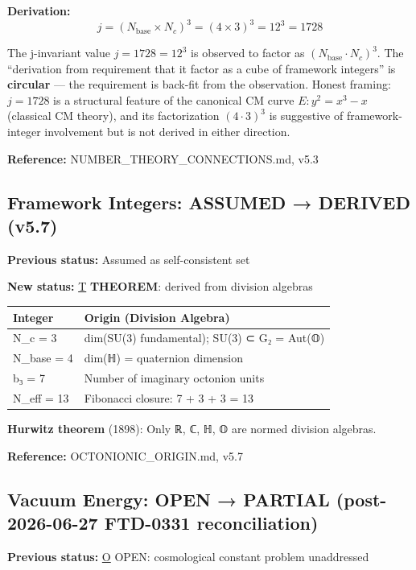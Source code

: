 \documentclass[
  11pt,
  letterpaper,
  twoside,
  openright]{book}
\begin{document}
\textbf{Derivation:}
\[j = (N_{\text{base}} \times N_c)^3 = (4 \times 3)^3 = 12^3 = 1728\]

The j-invariant value \(j = 1728 = 12^3\) is observed to factor as
\((N_\mathrm{base} \cdot N_c)^3\). The ``derivation from requirement
that it factor as a cube of framework integers'' is \textbf{circular}
--- the requirement is back-fit from the observation. Honest framing:
\(j = 1728\) is a structural feature of the canonical CM curve
\(E: y^2 = x^3 - x\) (classical CM theory), and its factorization
\((4 \cdot 3)^3\) is suggestive of framework-integer involvement but is
not derived in either direction.

\textbf{Reference:} NUMBER\_THEORY\_CONNECTIONS.md, v5.3

\subsection{Framework Integers: ASSUMED → DERIVED
(v5.7)}\label{framework-integers-assumed-derived-v5.7}

\textbf{Previous status:} Assumed as self-consistent set

\textbf{New status:} \hyperref[t]{T} \textbf{THEOREM}: derived from
division algebras

\begin{longtable}[]{@{}ll@{}}
\toprule\noalign{}
Integer & Origin (Division Algebra) \\
\midrule\noalign{}
\endhead
\bottomrule\noalign{}
\endlastfoot
N\_c = 3 & dim(SU(3) fundamental); SU(3) ⊂ G₂ = Aut(𝕆) \\
N\_base = 4 & dim(ℍ) = quaternion dimension \\
b₃ = 7 & Number of imaginary octonion units \\
N\_eff = 13 & Fibonacci closure: 7 + 3 + 3 = 13 \\
\end{longtable}

\textbf{Hurwitz theorem} (1898): Only ℝ, ℂ, ℍ, 𝕆 are normed division
algebras.

\textbf{Reference:} OCTONIONIC\_ORIGIN.md, v5.7

\subsection{Vacuum Energy: OPEN → PARTIAL (post-2026-06-27 FTD-0331
reconciliation)}\label{vacuum-energy-open-partial-post-2026-06-27-ftd-0331-reconciliation}

\textbf{Previous status:} \hyperref[o]{O} OPEN: cosmological constant
problem unaddressed
\end{document}
